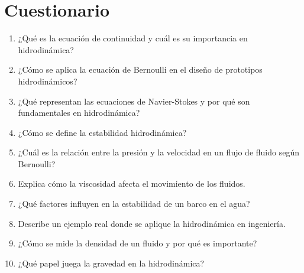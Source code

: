 \documentclass[../main]{subfiles}
\begin{document}

\section{Cuestionario}

\begin{enumerate}
    \item ¿Qué es la ecuación de continuidad y cuál es su importancia en hidrodinámica?
    \item ¿Cómo se aplica la ecuación de Bernoulli en el diseño de prototipos hidrodinámicos?
    \item ¿Qué representan las ecuaciones de Navier-Stokes y por qué son fundamentales en hidrodinámica?
    \item ¿Cómo se define la estabilidad hidrodinámica?
    \item ¿Cuál es la relación entre la presión y la velocidad en un flujo de fluido según Bernoulli?
    \item Explica cómo la viscosidad afecta el movimiento de los fluidos.
    \item ¿Qué factores influyen en la estabilidad de un barco en el agua?
    \item Describe un ejemplo real donde se aplique la hidrodinámica en ingeniería.
    \item ¿Cómo se mide la densidad de un fluido y por qué es importante?
    \item ¿Qué papel juega la gravedad en la hidrodinámica?
\end{enumerate}
\end{document}
